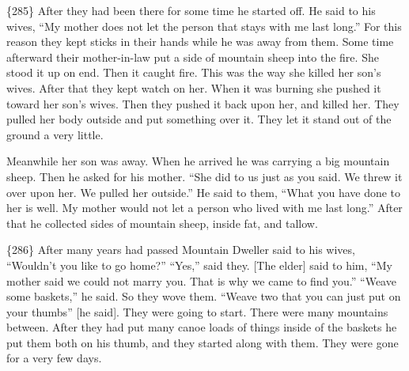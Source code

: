 \{285\}
After they had been there for some time he started off.
He said to his wives,
“My mother does not let the person that stays with me last long.”
For this reason they kept sticks in their hands while he was away from them.
Some time afterward their mother-in-law put a side of mountain sheep into the fire.
She stood it up on end.
Then it caught fire.
This was the way she killed her son’s wives.
After that they kept watch on her.
When it was burning she pushed it toward her son’s wives.
Then they pushed it back upon her, and killed her.
They pulled her body outside and put something over it.
They let it stand out of the ground a very little.

Meanwhile her son was away.
When he arrived he was carrying a big mountain sheep.
Then he asked for his mother.
“She did to us just as you said.
We threw it over upon her.
We pulled her outside.”
He said to them,
“What you have done to her is well.
My mother would not let a person who lived with me last long.”
After that he collected sides of mountain sheep, inside fat, and tallow.

\{286\}
After many years had passed Mountain Dweller said to his wives,
“Wouldn’t you like to go home?”
“Yes,” said they.
{}[The elder] said to him,
“My mother said we could not marry you.
That is why we came to find you.”
“Weave some baskets,”
he said.
So they wove them.
“Weave two that you can just put on your thumbs” [he said].
They were going to start.
There were many mountains between.
After they had put many canoe loads of things inside of the baskets he put them both on his thumb, and they started along with them.
They were gone for a very few days.

